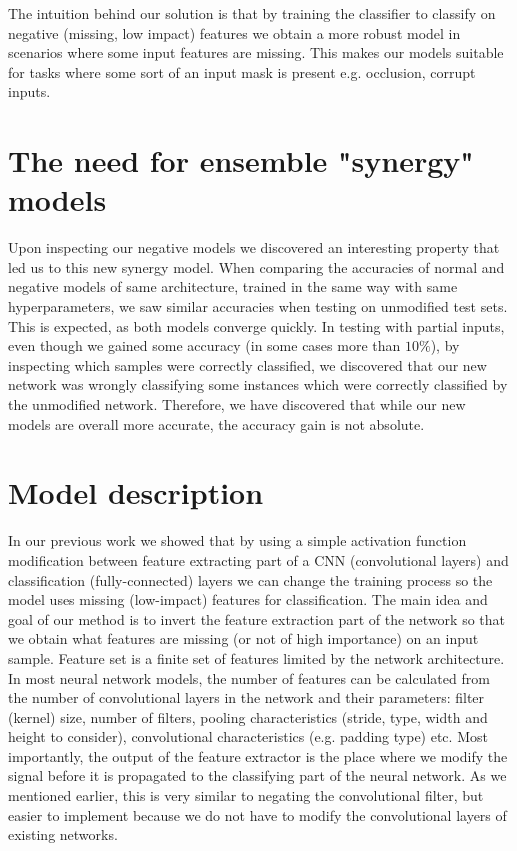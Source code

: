 \documentclass[b5paper]{book}
\let\cite\parencite
\begin{document}
The intuition behind our solution is that by training the classifier to classify on negative (missing, low impact) features we obtain a more robust model in scenarios where some input features are missing. This makes our models suitable for tasks where some sort of an input mask is present e.g. occlusion, corrupt inputs.

\section{The need for ensemble "synergy" models}

Upon inspecting our negative models we discovered an interesting property that led us to this new synergy model. When comparing the accuracies of normal and negative models of same architecture, trained in the same way with same hyperparameters, we saw similar accuracies when testing on unmodified test sets. This is expected, as both models converge quickly. In testing with partial inputs, even though we gained some accuracy (in some cases more than \(10\%\)), by inspecting which samples were correctly classified, we discovered that our new network was wrongly classifying some instances which were correctly classified by the unmodified network. Therefore, we have discovered that while our new models are overall more accurate, the accuracy gain is not absolute.

\section{Model description}
\label{model}

In our previous work \cite{milovsevic2019classification} we showed that by using a simple activation function modification between feature extracting part of a CNN (convolutional layers) and classification (fully-connected) layers we can change the training process so the model uses missing (low-impact) features for classification. The main idea and goal of our method is to invert the feature extraction part of the network so that we obtain what features are missing (or not of high importance) on an input sample. Feature set is a finite set of features limited by the network architecture. In most neural network models, the number of features can be calculated from the number of convolutional layers in the network and their parameters: filter (kernel) size, number of filters, pooling characteristics (stride, type, width and height to consider), convolutional characteristics (e.g. padding type) etc. Most importantly, the output of the feature extractor is the place where we modify the signal before it is propagated to the classifying part of the neural network. As we mentioned earlier, this is very similar to negating the convolutional filter, but easier to implement because we do not have to modify the convolutional layers of existing networks.
\end{document}
